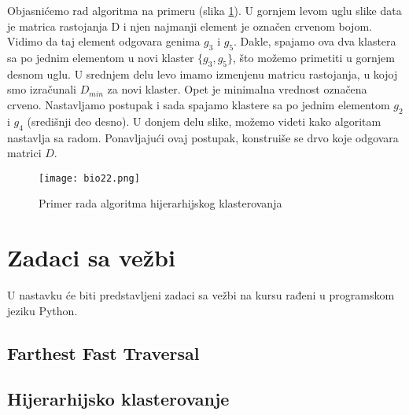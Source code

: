 \documentclass[a4paper]{book}
\begin{document}
Objasnićemo rad algoritma na primeru (slika \ref{slika 22}). U gornjem levom uglu slike data je matrica rastojanja D i njen najmanji element je označen crvenom bojom. Vidimo da taj element odgovara genima $g_3$ i $g_5$. Dakle, spajamo ova dva klastera sa po jednim elementom u novi klaster $\{g_3,g_5\}$, što možemo primetiti u gornjem desnom uglu. U srednjem delu levo imamo izmenjenu matricu rastojanja, u kojoj smo izračunali $D_{min}$ za novi klaster. Opet je minimalna vrednost označena crveno. Nastavljamo postupak i sada spajamo klastere sa po jednim elementom $g_2$ i $g_4$ (središnji deo desno). U donjem delu slike, možemo videti kako algoritam nastavlja sa radom. Ponavljajući ovaj postupak, konstruiše se drvo koje odgovara matrici $D$.
\newpage
\begin{figure}[h!]
    \centering
    \texttt{[image: bio22.png]}
    \caption{Primer rada algoritma hijerarhijskog klasterovanja}
    \label{slika 22}
\end{figure}
	
\section{Zadaci sa vežbi}
\setexamplecodestyle

U nastavku će biti predstavljeni zadaci sa vežbi na kursu rađeni u programskom jeziku Python.

\subsection{Farthest Fast Traversal}

\subsection{Hijerarhijsko klasterovanje}	

	
	
\end{document}
